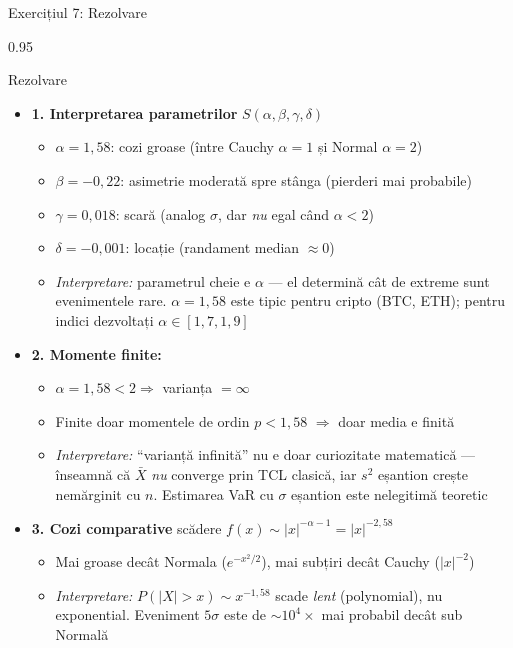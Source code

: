 \documentclass[9pt, aspectratio=169, t]{beamer}
\begin{document}
\begin{frame}[shrink=25]{Exercițiul 7: Rezolvare}
\begin{cminipage}{0.95\textwidth}
\begin{exampleblock}{Rezolvare}
\begin{itemize}\setlength{\itemsep}{0pt}
    \item \textbf{1. Interpretarea parametrilor} \quad $S(\alpha, \beta, \gamma, \delta)$
    \begin{itemize}\setlength{\itemsep}{0pt}
        \item $\alpha = 1{,}58$: cozi groase (între Cauchy $\alpha=1$ și Normal $\alpha=2$)
        \item $\beta = -0{,}22$: asimetrie moderată spre stânga (pierderi mai probabile)
        \item $\gamma = 0{,}018$: scară (analog $\sigma$, dar \emph{nu} egal când $\alpha < 2$)
        \item $\delta = -0{,}001$: locație (randament median $\approx 0$)
        \item \textit{Interpretare:} parametrul cheie e $\alpha$ --- el determină cât de extreme sunt evenimentele rare. $\alpha = 1{,}58$ este tipic pentru cripto (BTC, ETH); pentru indici dezvoltați $\alpha \in [1{,}7, 1{,}9]$
    \end{itemize}
    \item \textbf{2. Momente finite:}
    \begin{itemize}\setlength{\itemsep}{0pt}
        \item $\alpha = 1{,}58 < 2 \Rightarrow$ varianța $= \infty$
        \item Finite doar momentele de ordin $p < 1{,}58$ $\Rightarrow$ doar media e finită
        \item \textit{Interpretare:} ``varianță infinită'' nu e doar curiozitate matematică --- înseamnă că $\bar X$ \emph{nu} converge prin TCL clasică, iar $s^2$ eșantion crește nemărginit cu $n$. Estimarea VaR cu $\sigma$ eșantion este nelegitimă teoretic
    \end{itemize}
    \item \textbf{3. Cozi comparative} \quad scădere $f(x) \sim |x|^{-\alpha - 1} = |x|^{-2{,}58}$
    \begin{itemize}\setlength{\itemsep}{0pt}
        \item Mai groase decât Normala ($e^{-x^2/2}$), mai subțiri decât Cauchy ($|x|^{-2}$)
        \item \textit{Interpretare:} $P(|X| > x) \sim x^{-1{,}58}$ scade \emph{lent} (polynomial), nu exponential. Eveniment $5\sigma$ este de $\sim 10^4 \times$ mai probabil decât sub Normală

\end{itemize}
\end{itemize}
\end{exampleblock}
\end{cminipage}
\end{frame}
\end{document}
